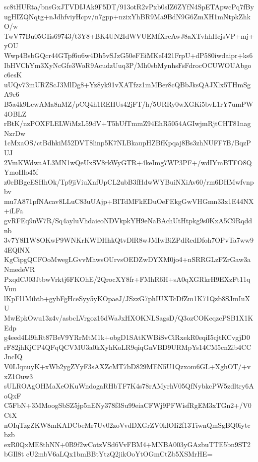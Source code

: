 sc8tHURta/bnsGxJTVDIJAk9F5DT/913otR2vPxb0sIZ6ZYfN4SpETApwcPq7fBy
ugHIZQNqtg+nJdhfviyHcpv/n7gpp+nzixYhBR9Ma9BdN9G6ZmXH1mNtpkZhkO/w
TwV77Bu05GIis69743/t3Y8+BK4UN2IdWVUEMfXreAwJ8aXTvhhHcjsVP+mj+yOU
Wwp4BsbGQcr44GTpf6u6w4Dh5vSJzG50eFEiMKeI421FrpU+dP580iwdaipr+ks6
IbHVChYm3XyNcGfe3WoR9AcudzUuq3P/Mh0sbMynhsFsFdrocOCUWOUAbgoc6esK
uUQv73mURZScJ3MlDg8+Yz8yk91vXATfzz1mMBer8cQBbJksQAJXlx5THmSgA9c6
B5a4k9LcwAMa8nMZ/pCQ4h1REHUs42jFT/h/5URRy0wXGKi5bvL1rY7umPW4OBLZ
rBtK/nzPOXFLELWiMzL59dV+T5hUfTmmZ94EhR5054AGIwjmRjtCHT81nagNzrDw
1cMxaOS/ctBdhkiM52DVT8linp5K7NLBkaupHZBfKpqaj8Bs3zhNUFF7B/BqzPUJ
2VmKWdwaAL3MN1wQeUxSV8rkWyGTR+4keImg7WP3PF+/wdIYmBTFO8QYmoHlo45f
z0cBBgcESHhOk/Tp9jiViuXnfUpCL2ubB3fHdwWYBuiNXiAv60/rm6DHMwfvnpbv
mu7A871pfNAcav8LLuC83uUAjp+BITdMFkEDuOeFEkgGwVHGmn33x1E44NX+iLFa
gvRFEq9nW7R/Sq4ayluVhdaieoNDVkpkYH9eNaBAchUtHtpkg9s0KxA5C9Rqddnb
3v7Y8I1W8OKwP9WNKrKWDHhkQtvDlR8wJMIwBiZPdRedDfoh7OPvTa7ww94EQlNX
KgCipgQCFOoMwegLGvvMhwsOUrvsOEDZwDYXM0jo4+nSRRGLzFZrGaw3aNmedeVR
PxqdCJ03JtbwVrktj6FKOhE/2QrocXY8fr+FMhR6H+sA0qXGRkrH9EXzFt11qVuu
lKpFl1Mihtb+gybFgHceSyy5yKOpaeJ/JSzzG7phIUXTcDfZm1K71Qzb8SJmIuXU
MwEpkOwu13z4v/asbcLVrgoz16dWaJxHXOKNLSagsD/Q3ozCOKcqzcPSB1X1KEdp
g4eed4Ll9hRt87BeV9YRrMtM1k+obgD1SAtKWBiSvCiRxekR0eqiI5cjtKCvgjD0
rF82jhKjCP4QFqQCVMU3a0kXyhKoLR9qiqGnVBD9URMpYs14CM5cnZib4CCJncIQ
V0LIqnuyK+xWb2ygZYyF3sAXZcMT7bD829MEN5U1Qzxom6GL+XghOT/+vxZ1Ouw3
sULROAgOHMaXeOKuWndogaRHbTF7K4s78rAMyrhV05QfNybkcPW5zdltry6AoQxF
C5FbN+3MMoogSbSZ5jp5nENy378f3Su99eiaCFWj9PFWisfRgEM3xTGn2+/V0CtX
nOIqTzgZKW8mKADCbeMr7Uv02zoVvdDXGrZV0klOIi2f13TiwnQmSgBQ0iytcbzb
exR0QxME8thNN+0B9f2wCotzVSd6VvFBM4+MNBA003yGAzbuTTE5bn9ST2bGIl8t
cU2mbV6aLQx1bmBBtYtzQ2jikOoYtOGmCtZb5XSMrHE=
